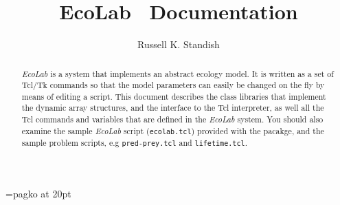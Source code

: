 %
\title{EcoLab \ Documentation}
\author{Russell K. Standish}



\newcommand{\br}{\mbox{${\bf r}$}} %
\newcommand{\bbeta}{\mbox{\boldmath{$\beta$}}}   %
\newcommand{\bgamma}{\mbox{\boldmath{$\gamma$}}} %
\newcommand{\bmu}{\mbox{\boldmath{$\mu$}}}       %
\newcommand{\bn}{\mbox{\boldmath{$n$}}}          %
\newcommand{\nsp}{\mbox{$n_{\rm sp}$}}           %

\font\ecolabfont=pagko at 20pt
\newcommand{\EcoLab}{%
\pscharpath*[linewidth=1pt,fillstyle=solid,fillcolor=red]{\ecolabfont
EcoLab}}


\maketitle
\begin{abstract}
{\sl EcoLab} is a system that implements an abstract ecology
model.\cite{Standish94} It is written as a set of
Tcl/Tk\cite{Ousterhout94} commands so that the model parameters can
easily be changed on the fly by means of editing a script. This
document describes the class libraries that implement the dynamic
array structures, and the interface to the Tcl interpreter, as well
all the Tcl commands and variables that are defined in the {\sl
EcoLab} system. You should also examine the sample {\sl EcoLab} script
(\verb|ecolab.tcl|) provided with the pacakge, and the sample problem
scripts, e.g \verb|pred-prey.tcl| and \verb|lifetime.tcl|.
\end{abstract}

\tableofcontents












